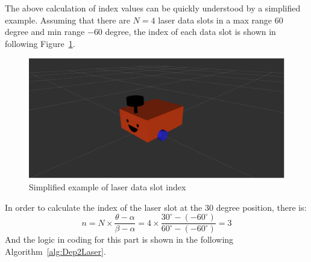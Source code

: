 The above calculation of index values can be quickly understood by a simplified example. 
Assuming that there are $N=4$ laser data slots in a max range $60$ degree and min range $-60$ degree, 
the index of each data slot is shown in following Figure~\ref{fig:laser_index}.

\begin{figure}[H]
    \centering
    \includegraphics[width=0.8\linewidth]{figs/robot.png}
    \caption{Simplified example of laser data slot index}
    \label{fig:laser_index}
\end{figure}
In order to calculate the index of the laser slot at the 30 degree position, there is: 
\begin{equation*}
    n=N\times\frac{\theta-\alpha}{\beta-\alpha}=4\times\frac{30^\circ-(-60^\circ)}{60^\circ-(-60^\circ) }=3
\end{equation*}
And the logic in coding for this part is shown in the following Algorithm~\ref{alg:Dep2Laser}.
